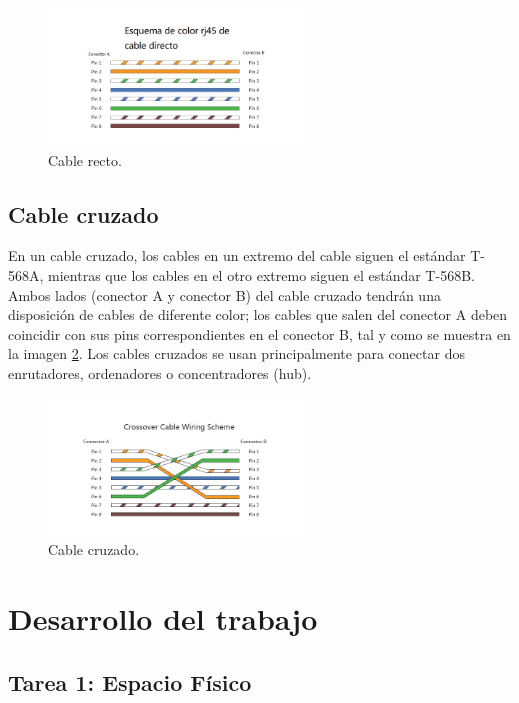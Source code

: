     \begin{figure}[H]
        \centering
        \includegraphics[width=0.6\textwidth]{img/cable_recto.jpg}
        \caption{Cable recto.}
        \label{fig:cable_recto}
    \end{figure}

    \subsection{Cable cruzado}
    En un cable cruzado, los cables en un extremo del cable siguen el estándar T-568A, mientras que los cables en el otro extremo siguen el estándar T-568B. Ambos lados (conector A y conector B) del cable cruzado tendrán una disposición de cables de diferente color; los cables que salen del conector A deben coincidir con sus pins correspondientes en el conector B, tal y como se muestra en la imagen \ref{fig:cable_cruzado}. Los cables cruzados se usan principalmente para conectar dos enrutadores, ordenadores o concentradores (hub).

    \begin{figure}[H]
        \centering
        \includegraphics[width=0.6\textwidth]{img/cable_cruzado.jpg}
        \caption{Cable cruzado.}
        \label{fig:cable_cruzado}
    \end{figure}

    \newpage
\section{Desarrollo del trabajo}
    \subsection{Tarea 1: Espacio Físico}
